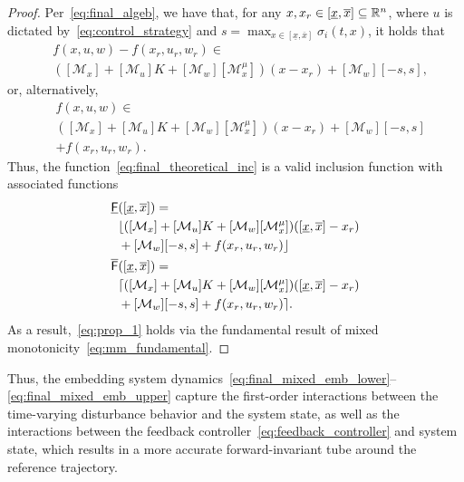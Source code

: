 \documentclass{IEEEojcsys}
\newcommand{\ul}{\underline}
\newcommand{\ol}{\overline}
\begin{document}
\begin{proof}
Per~\eqref{eq:final_algeb}, we have that, for any $x, x_r \in [\ul{x}, \ol{x}] \subseteq\bbR^n$, where $u$ is dictated by~\eqref{eq:control_strategy} and $s = \max_{x\in[\ul{x}, \ol{x}]} \sigma_i(t,x)$, it holds that
\begin{align}
    &f(x, u, w) - f(x_r, u_r, w_r) \in \\ &([\mathcal{M}_x] + [\mathcal{M}_u]K + [\mathcal{M}_w][\mathcal{M}^\mu_x])(x - x_r) + [\mathcal{M}_w][-s,s], \nonumber
\end{align}
or, alternatively,
\begin{align}
    &f(x, u, w) \in \\ &([\mathcal{M}_x] + [\mathcal{M}_u]K + [\mathcal{M}_w][\mathcal{M}^\mu_x])(x - x_r) + [\mathcal{M}_w][-s,s] \nonumber\\&+ f(x_r, u_r, w_r). \nonumber
\end{align}
Thus, the function~\eqref{eq:final_theoretical_inc} is a valid inclusion function with associated functions
\begin{align}
    \ul{\sfF}&([\ul{x}, \ol{x}])=\\
    &\lfloor([\mathcal{M}_x] + [\mathcal{M}_u]K + [\mathcal{M}_w][\mathcal{M}^\mu_x])([\ulx, \olx] - x_r) \nonumber\\
     &+ [\mathcal{M}_w][-s,s] + f(x_r, u_r, w_r)\rfloor\nonumber \\
    \ol{\sfF}&([\ul{x}, \ol{x}])= \\
    &\lceil([\mathcal{M}_x] + [\mathcal{M}_u]K + [\mathcal{M}_w][\mathcal{M}^\mu_x])([\ulx, \olx] - x_r) \nonumber\\
     &+ [\mathcal{M}_w][-s,s] + f(x_r, u_r, w_r)\rceil.\nonumber
\end{align}
As a result,~\eqref{eq:prop_1} holds via the fundamental result of mixed monotonicity~\eqref{eq:mm_fundamental}.
\end{proof}


Thus, the embedding system dynamics~\eqref{eq:final_mixed_emb_lower}--\eqref{eq:final_mixed_emb_upper} capture the first-order interactions between the time-varying disturbance behavior and the system state, as well as the interactions between the feedback controller~\eqref{eq:feedback_controller} and system state, which results in a more accurate forward-invariant tube around the reference trajectory. 
\end{document}
